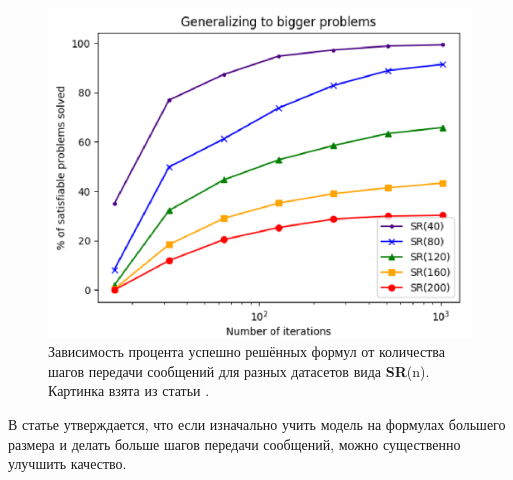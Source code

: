 \begin{figure}[ht]
\begin{center}
    \includegraphics[scale=0.25]{./assets/neurosat-success-rate-plot.png}
    \caption{\label{neurosat-success-rate-plot} Зависимость процента успешно решённых формул от количества шагов передачи сообщений для разных датасетов вида \textbf{SR}(n). Картинка взята из статьи \cite{neurosat-paper}.}
\end{center}
\end{figure}

В статье утверждается, что если изначально учить модель на формулах большего размера и делать больше шагов передачи сообщений, можно существенно улучшить качество.


